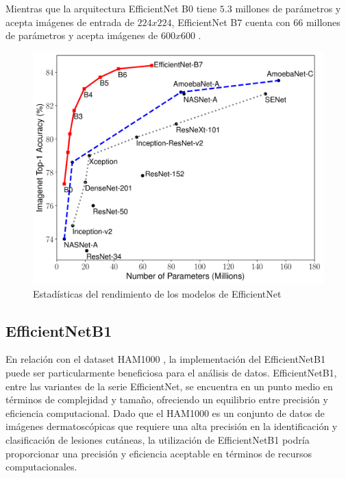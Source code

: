 Mientras que la arquitectura EfficientNet B0 tiene $5.3$ millones de parámetros y acepta imágenes de entrada de $224x224$, EfficientNet B7 cuenta con $66$ millones de parámetros y acepta imágenes de $600x600$ .
   
   \begin{figure}[ht]%
      \begin{center}
      \includegraphics[width=1\textwidth]{./Graphics/efficientnet_performance.png}
      \caption{Estadísticas del rendimiento de los modelos de EfficientNet}
      \label{fig:efficientnet_performance}
      \end{center}
      \end{figure}
   
\subsection{EfficientNetB1}
   
   En relación con el dataset HAM1000 , la implementación del EfficientNetB1 puede ser particularmente beneficiosa para el análisis de datos. EfficientNetB1, entre las variantes de la serie EfficientNet, se encuentra en un punto medio en términos de complejidad y tamaño, ofreciendo un equilibrio entre precisión y eficiencia computacional. Dado que el HAM1000 es un conjunto de datos de imágenes dermatoscópicas que requiere una alta precisión en la identificación y clasificación de lesiones cutáneas, la utilización de EfficientNetB1 podría proporcionar una precisión y eficiencia aceptable en términos de recursos computacionales.


